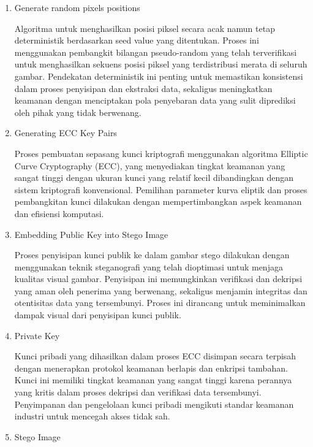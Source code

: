\documentclass{ittelkom}
\begin{document}
\begin{enumerate}
    \item Generate random pixels positions

          Algoritma untuk menghasilkan posisi piksel secara acak namun tetap
          deterministik berdasarkan seed value yang ditentukan. Proses ini menggunakan
          pembangkit bilangan pseudo-random yang telah terverifikasi untuk menghasilkan
          sekuens posisi piksel yang terdistribusi merata di seluruh gambar. Pendekatan
          deterministik ini penting untuk memastikan konsistensi dalam proses penyisipan
          dan ekstraksi data, sekaligus meningkatkan keamanan dengan menciptakan pola
          penyebaran data yang sulit diprediksi oleh pihak yang tidak berwenang.

    \item Generating ECC Key Pairs

          Proses pembuatan sepasang kunci kriptografi menggunakan algoritma Elliptic
          Curve Cryptography (ECC), yang menyediakan tingkat keamanan yang sangat tinggi
          dengan ukuran kunci yang relatif kecil dibandingkan dengan sistem kriptografi
          konvensional. Pemilihan parameter kurva eliptik dan proses pembangkitan kunci
          dilakukan dengan mempertimbangkan aspek keamanan dan efisiensi komputasi.

    \item Embedding Public Key into Stego Image

          Proses penyisipan kunci publik ke dalam gambar stego dilakukan dengan
          menggunakan teknik steganografi yang telah dioptimasi untuk menjaga kualitas
          visual gambar. Penyisipan ini memungkinkan verifikasi dan dekripsi yang aman
          oleh penerima yang berwenang, sekaligus menjamin integritas dan otentisitas
          data yang tersembunyi. Proses ini dirancang untuk meminimalkan dampak visual
          dari penyisipan kunci publik.

    \item Private Key

          Kunci pribadi yang dihasilkan dalam proses ECC disimpan secara terpisah dengan
          menerapkan protokol keamanan berlapis dan enkripsi tambahan. Kunci ini memiliki
          tingkat keamanan yang sangat tinggi karena perannya yang kritis dalam proses
          dekripsi dan verifikasi data tersembunyi. Penyimpanan dan pengelolaan kunci
          pribadi mengikuti standar keamanan industri untuk mencegah akses tidak sah.

    \item Stego Image


\end{enumerate}
\end{document}
